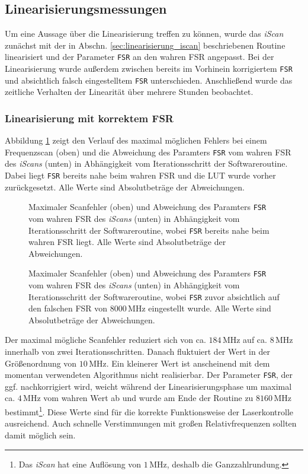 \subsection{Linearisierungsmessungen}\label{sec:linearisierungsmessungen}
Um eine Aussage über die Linearisierung treffen zu können, wurde das
\textit{iScan} zunächst mit der in Abschn. \ref{sec:linearisierung_iscan}
beschriebenen Routine linearisiert und der Parameter \lstinline|FSR| an den wahren FSR
angepasst. Bei der Linearisierung wurde außerdem
zwischen bereits im Vorhinein korrigiertem \lstinline|FSR| und absichtlich
falsch eingestelltem \lstinline|FSR| unterschieden. Anschließend wurde das
zeitliche Verhalten der Linearität über mehrere Stunden beobachtet.

\subsubsection{Linearisierung mit korrektem
FSR}\label{subsubsec:linearisierung_FSR_okay}
Abbildung \ref{fig:linearisierung_FSR_okay} zeigt den Verlauf des maximal
möglichen Fehlers bei einem Frequenzscan (oben) und die Abweichung des Paramters \lstinline|FSR| vom wahren FSR des \textit{iScans} (unten) in Abhängigkeit vom Iterationsschritt der
Softwareroutine. Dabei liegt \lstinline|FSR| bereits nahe beim wahren FSR und
die LUT wurde vorher zurückgesetzt. Alle Werte sind Absolutbeträge der
Abweichungen.
\begin{figure}[h]
 	\centering
 	\footnotesize
	
	\caption[Linearisierung \textit{iScan}, FSR okay]{Maximaler Scanfehler (oben)
	und Abweichung des Paramters \lstinline|FSR| vom wahren FSR des
	\textit{iScans} (unten) in Abhängigkeit vom Iterationsschritt der
	Softwareroutine, wobei \lstinline|FSR| bereits nahe beim wahren FSR liegt. Alle
	Werte sind Absolutbeträge der Abweichungen.}
	\label{fig:linearisierung_FSR_okay}
\end{figure}
\begin{figure}[h]
 	\centering
 	\footnotesize
	
	\caption[Linearisierung \textit{iScan}, FSR korrigiert (1)]{Maximaler
	Scanfehler (oben) und Abweichung des Paramters \lstinline|FSR| vom wahren
	FSR des \textit{iScans} (unten) in Abhängigkeit vom Iterationsschritt der
	Softwareroutine, wobei \lstinline|FSR| zuvor absichtlich auf den falschen FSR
	von $8000\,$MHz eingestellt wurde. Alle Werte sind Absolutbeträge der Abweichungen.}
	\label{fig:linearisierung_FSR_korr}
\end{figure}
Der maximal mögliche Scanfehler reduziert sich von
ca. $184\,$MHz auf ca. $8\,$MHz innerhalb von zwei Iterationsschritten. Danach
fluktuiert der Wert in der Größenordnung von $10\,$MHz. Ein kleinerer Wert ist
anscheinend mit dem momentan verwendeten Algorithmus nicht realisierbar. Der
Parameter \lstinline|FSR|, der ggf. nachkorrigiert wird, weicht
während der Linearisierungsphase um maximal ca. $4\,$MHz vom wahren Wert ab und
wurde am Ende der Routine zu $8160\,$MHz bestimmt\footnote{Das \textit{iScan}
hat eine Auflösung von $1\,$MHz, deshalb die Ganzzahlrundung.}. Diese Werte sind
für die korrekte Funktionsweise der Laserkontrolle ausreichend. Auch schnelle Verstimmungen mit großen
Relativfrequenzen sollten damit möglich sein.

